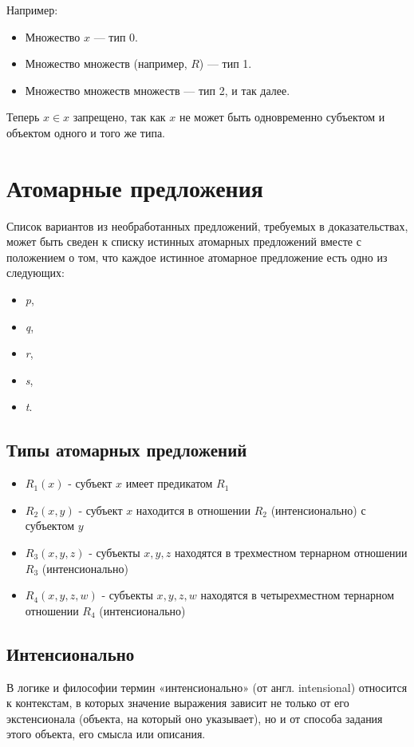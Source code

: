 \documentclass[a4paper, 12pt]{article}
\begin{document}
Например:
\begin{itemize} 
 \item Множество $x$ — тип 0.
 \item Множество множеств (например, $R$) — тип 1.
 \item Множество множеств множеств — тип 2, и так далее.
\end{itemize} 

Теперь $x \in x$ запрещено, так как $x$ не может быть одновременно субъектом и объектом одного и того же типа.

\section{Атомарные предложения}
Список вариантов из необработанных предложений, требуемых в доказательствах, может быть сведен к списку истинных атомарных предложений вместе с положением о том, что каждое истинное атомарное предложение есть одно из следующих:
\begin{itemize} 
 \item \textit{p},
 \item \textit{q},
 \item \textit{r},
 \item \textit{s},
 \item \textit{t}.
\end{itemize} 

\subsection{Типы атомарных предложений}
\begin{itemize} 
 \item $R_1(x)$ - субъект $x$ имеет предикатом $R_1$
 \item $R_2(x,y)$ - субъект $x$ находится в отношении $R_2$ (интенсионально) с субъектом $y$
 \item $R_3(x,y,z)$ - субъекты $x,y,z$ находятся в трехместном тернарном отношении $R_3$ (интенсионально)
  \item $R_4(x,y,z,w)$ - субъекты $x,y,z,w$ находятся в четырехместном тернарном отношении $R_4$ (интенсионально)
\end{itemize}

\subsection{Интенсионально}
В логике и философии термин «интенсионально» (от англ. intensional) относится к контекстам, в которых значение выражения зависит не только от его экстенсионала (объекта, на который оно указывает), но и от способа задания этого объекта, его смысла или описания.
\end{document}
